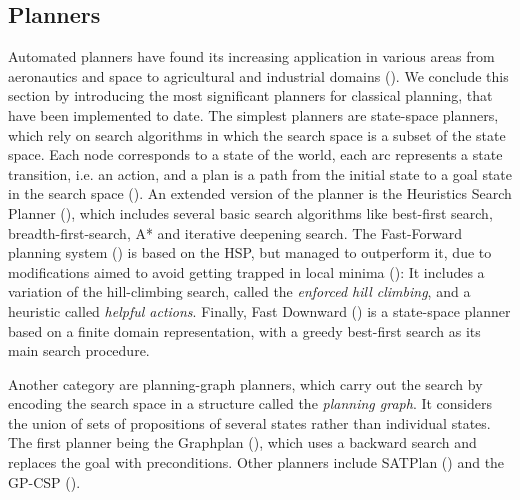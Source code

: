 \subsection{Planners}\label{subsec:Planners}
Automated planners have found its increasing application in various areas from aeronautics and space to agricultural and industrial domains (\cite{aarup1992optimum}). We conclude this section by introducing the most significant planners for classical planning, that have been implemented to date. The simplest planners are state-space planners, which rely on search algorithms in which the search space is a subset of the state space. Each node corresponds to a state of the world, each arc represents a state transition, i.e. an action, and a plan is a path from the initial state to a goal state in the search space (\cite{ghallab2004automated}). An extended version of the planner is the Heuristics Search Planner (\cite{bonet:01}), which includes several basic search algorithms like best-first search, breadth-first-search, A* and iterative deepening search. The Fast-Forward planning system (\cite{hoffmann:11}) is based on the HSP, but managed to outperform it, due to modifications aimed to avoid getting trapped in local minima (\cite{hoffmann2000heuristic}): It includes a variation of the hill-climbing search, called the \textit{enforced hill climbing}, and a heuristic called \textit{helpful actions}. Finally, Fast Downward (\cite{helmert:06a}) is a state-space planner based on a finite domain representation, with a greedy best-first search as its main search procedure. 

Another category are planning-graph planners, which carry out the search by encoding the search space in a structure called the \textit{planning graph}. It considers the union of sets of propositions of several states rather than individual states. The first planner being the Graphplan (\cite{blum:97}), which uses a backward search and replaces the goal with preconditions. Other planners include SATPlan (\cite{kautz:06,kautz:99}) and the GP-CSP (\cite{do:01}).